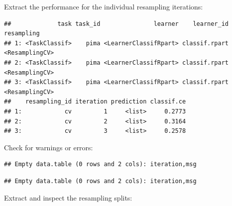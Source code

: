 \documentclass[]{scrbook}
\newenvironment{Shaded}{\begin{snugshade}}{\end{snugshade}}
\newcommand{\KeywordTok}[1]{\textcolor[rgb]{0.13,0.29,0.53}{\textbf{#1}}}
\newcommand{\NormalTok}[1]{#1}
\newcommand{\OperatorTok}[1]{\textcolor[rgb]{0.81,0.36,0.00}{\textbf{#1}}}
\newcommand{\StringTok}[1]{\textcolor[rgb]{0.31,0.60,0.02}{#1}}
\renewenvironment{Shaded} {\begin{snugshade}\small} {\end{snugshade}}
\begin{document}
Extract the performance for the individual resampling iterations:

\begin{Shaded}
\end{Shaded}

\begin{verbatim}
##             task task_id               learner    learner_id     resampling
## 1: <TaskClassif>    pima <LearnerClassifRpart> classif.rpart <ResamplingCV>
## 2: <TaskClassif>    pima <LearnerClassifRpart> classif.rpart <ResamplingCV>
## 3: <TaskClassif>    pima <LearnerClassifRpart> classif.rpart <ResamplingCV>
##    resampling_id iteration prediction classif.ce
## 1:            cv         1     <list>     0.2773
## 2:            cv         2     <list>     0.3164
## 3:            cv         3     <list>     0.2578
\end{verbatim}

Check for warnings or errors:

\begin{Shaded}
\end{Shaded}

\begin{verbatim}
## Empty data.table (0 rows and 2 cols): iteration,msg
\end{verbatim}

\begin{Shaded}
\end{Shaded}

\begin{verbatim}
## Empty data.table (0 rows and 2 cols): iteration,msg
\end{verbatim}

Extract and inspect the resampling splits:

\begin{Shaded}
\end{Shaded}
\end{document}
